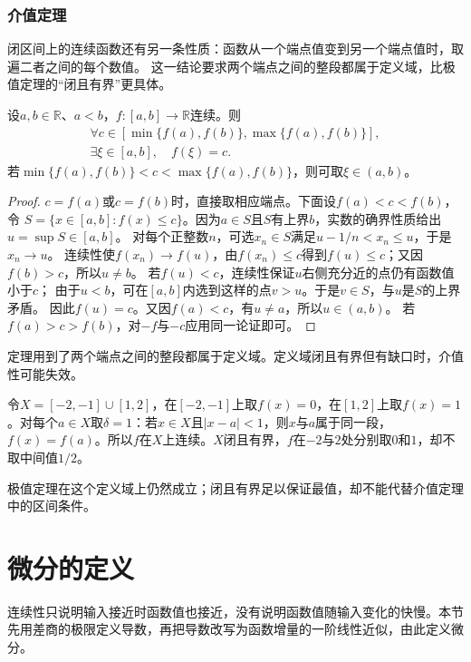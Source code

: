 \subsubsection{介值定理}
闭区间上的连续函数还有另一条性质：函数从一个端点值变到另一个端点值时，取遍二者之间的每个数值。
这一结论要求两个端点之间的整段都属于定义域，比极值定理的“闭且有界”更具体。
\begin{theorem}[闭区间上的介值定理]
\label{thm:analysis-intermediate-value}
设$a,b\in\mathbb R$、$a<b$，$f:[a,b]\to\mathbb R$连续。则
\[
 \begin{gathered}
 \forall c\in[\min\{f(a),f(b)\},\max\{f(a),f(b)\}],\\
 \exists\xi\in[a,b],\quad f(\xi)=c.
 \end{gathered}
\]
若$\min\{f(a),f(b)\}<c<\max\{f(a),f(b)\}$，则可取$\xi\in(a,b)$。
\end{theorem}
\begin{proof}
$c=f(a)$或$c=f(b)$时，直接取相应端点。下面设$f(a)<c<f(b)$，令
$S=\{x\in[a,b]:f(x)\leq c\}$。因为$a\in S$且$S$有上界$b$，实数的确界性质给出$u=\sup S\in[a,b]$。
对每个正整数$n$，可选$x_n\in S$满足$u-1/n<x_n\leq u$，于是$x_n\to u$。
连续性使$f(x_n)\to f(u)$，由$f(x_n)\leq c$得到$f(u)\leq c$；又因$f(b)>c$，所以$u\neq b$。
若$f(u)<c$，连续性保证$u$右侧充分近的点仍有函数值小于$c$；
由于$u<b$，可在$[a,b]$内选到这样的点$v>u$。于是$v\in S$，与$u$是$S$的上界矛盾。
因此$f(u)=c$。又因$f(a)<c$，有$u\neq a$，所以$u\in(a,b)$。
若$f(a)>c>f(b)$，对$-f$与$-c$应用同一论证即可。
\end{proof}
定理用到了两个端点之间的整段都属于定义域。定义域闭且有界但有缺口时，介值性可能失效。
\begin{example}[有缺口的定义域上不取中间值]
\label{ex:analysis-intermediate-value-gap}
令$X=[-2,-1]\cup[1,2]$，在$[-2,-1]$上取$f(x)=0$，在$[1,2]$上取$f(x)=1$。对每个$a\in X$取$\delta=1$：若$x\in X$且$|x-a|<1$，则$x$与$a$属于同一段，$f(x)=f(a)$。所以$f$在$X$上连续。$X$闭且有界，$f$在$-2$与$2$处分别取$0$和$1$，却不取中间值$1/2$。
\end{example}
极值定理在这个定义域上仍然成立；闭且有界足以保证最值，却不能代替介值定理中的区间条件。

\par{}
\section{微分的定义}
\label{sec:analysis-derivatives-linear-approximation}

连续性只说明输入接近时函数值也接近，没有说明函数值随输入变化的快慢。本节先用差商的极限定义导数，再把导数改写为函数增量的一阶线性近似，由此定义微分。

